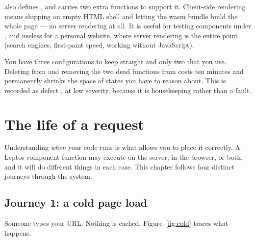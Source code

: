  also defines , and  carries two extra 
functions to support it. Client-side rendering means shipping an empty HTML shell and letting the
wasm bundle build the whole page --- no server rendering at all. It is useful for testing
components under , and useless for a personal website, where server rendering is
the entire point (search engines, first-paint speed, working without JavaScript).

You have three configurations to keep straight and only two that you use. Deleting 
from  and removing the two dead  functions from 
costs ten minutes and permanently shrinks the space of states you have to reason about. This is
recorded as defect , at low severity, because it is housekeeping rather than a fault.

\chapter{The life of a request}
\label{ch:lifecycle}

Understanding \emph{when} your code runs is what allows you to place it correctly. A Leptos
component function may execute on the server, in the browser, or both, and it will do different
things in each case. This chapter follows four distinct journeys through the system.

\section{Journey 1: a cold page load}

Someone types your URL. Nothing is cached. Figure~\ref{fig:cold} traces what happens.

